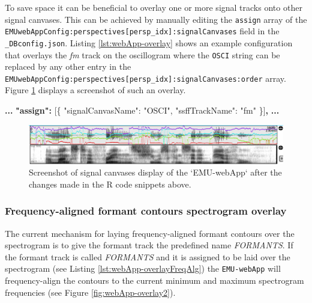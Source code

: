 \documentclass[]{book}
\newenvironment{Shaded}{\begin{snugshade}}{\end{snugshade}}
\newcommand{\DataTypeTok}[1]{\textcolor[rgb]{0.13,0.29,0.53}{#1}}
\newcommand{\ErrorTok}[1]{\textcolor[rgb]{0.64,0.00,0.00}{\textbf{#1}}}
\newcommand{\FunctionTok}[1]{\textcolor[rgb]{0.00,0.00,0.00}{#1}}
\newcommand{\OtherTok}[1]{\textcolor[rgb]{0.56,0.35,0.01}{#1}}
\newcommand{\StringTok}[1]{\textcolor[rgb]{0.31,0.60,0.02}{#1}}
\begin{document}
To save space it can be beneficial to overlay one or more signal tracks onto other signal canvases. This can be achieved by manually editing the \texttt{assign} array of the \texttt{EMUwebAppConfig:perspectives{[}persp\_idx{]}:signalCanvases} field in the \texttt{\_DBconfig.json}. Listing \ref{lst:webApp-overlay} shows an example configuration that overlays the \emph{fm} track on the oscillogram where the \texttt{OSCI} string can be replaced by any other entry in the \texttt{EMUwebAppConfig:perspectives{[}persp\_idx{]}:signalCanvases:order} array. Figure \ref{fig:webApp-overlay1} displays a screenshot of such an overlay.

\begin{Shaded}
\begin{Highlighting}[]
\ErrorTok{...}
\ErrorTok{"assign":} \OtherTok{[}\FunctionTok{\{}
    \DataTypeTok{"signalCanvasName"}\FunctionTok{:} \StringTok{"OSCI"}\FunctionTok{,}
    \DataTypeTok{"ssffTrackName"}\FunctionTok{:} \StringTok{"fm"}
\FunctionTok{\}}\OtherTok{]}\ErrorTok{,}
\ErrorTok{...}
\end{Highlighting}
\end{Shaded}

\begin{figure}

{\centering \includegraphics[width=1\linewidth]{pics/emu-webAppOverlay} 

}

\caption{Screenshot of signal canvases display of the `EMU-webApp` after the changes made in the R code snippets above.}\label{fig:webApp-overlay1}
\end{figure}

\hypertarget{subsubsec:emu-webAppFreqAlignedFormants}{%
\subsubsection{Frequency-aligned formant contours spectrogram overlay}\label{subsubsec:emu-webAppFreqAlignedFormants}}

The current mechanism for laying frequency-aligned formant contours over the spectrogram is to give the formant track the predefined name \emph{FORMANTS}. If the formant track is called \emph{FORMANTS} and it is assigned to be laid over the spectrogram (see Listing \ref{lst:webApp-overlayFreqAlg}) the \texttt{EMU-webApp} will frequency-align the contours to the current minimum and maximum spectrogram frequencies (see Figure \ref{fig:webApp-overlay2}).
\end{document}
